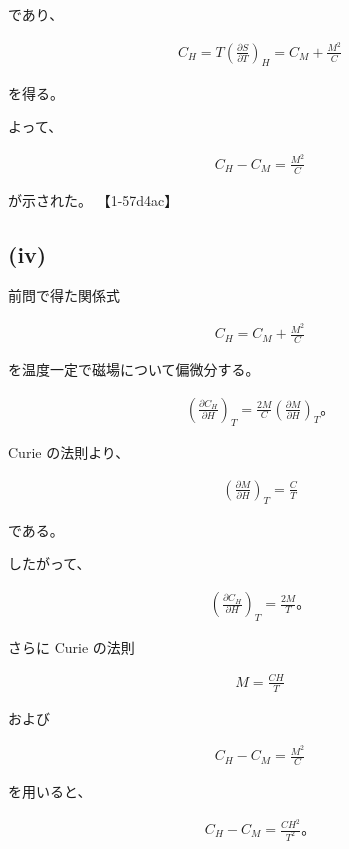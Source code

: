 \documentclass[platex,dvipdfmx,a4paper]{jsarticle}
\begin{document}
であり、

\begin{align*}
C_H
=
T
\left(
\frac{\partial S}{\partial T}
\right)_H
=
C_M+\frac{M^2}{C}
\end{align*}

を得る。

よって、

\begin{align*}
C_H-C_M
=
\frac{M^2}{C}
\end{align*}

が示された。 【1-57d4ac】

\subsection{(iv)}

前問で得た関係式

\begin{align*}
C_H
=
C_M+\frac{M^2}{C}
\end{align*}

を温度一定で磁場について偏微分する。

\begin{align*}
\left(
\frac{\partial C_H}{\partial H}
\right)_T
=
\frac{2M}{C}
\left(
\frac{\partial M}{\partial H}
\right)_T。
\end{align*}

Curie の法則より、

\begin{align*}
\left(
\frac{\partial M}{\partial H}
\right)_T
=
\frac{C}{T}
\end{align*}

である。

したがって、

\begin{align*}
\left(
\frac{\partial C_H}{\partial H}
\right)_T
=
\frac{2M}{T}。
\end{align*}

さらに Curie の法則

\begin{align*}
M=\frac{CH}{T}
\end{align*}

および

\begin{align*}
C_H-C_M
=
\frac{M^2}{C}
\end{align*}

を用いると、

\begin{align*}
C_H-C_M
=
\frac{CH^2}{T^2}。
\end{align*}
\end{document}
